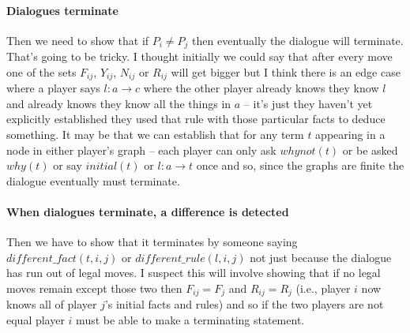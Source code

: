 \documentclass{blue-book}
\newcommand{\drule}[3]{\ensuremath{#1:#2 \rightarrow #3}}
\begin{document}
\paragraph{Dialogues terminate} Then we need to show that if $P_i \neq P_j$ then eventually the dialogue will terminate.  That's going to be tricky.  I thought initially we could say that after every move one of the sets $F_{ij}$, $Y_{ij}$, $N_{ij}$ or $R_{ij}$ will get bigger but I think there is an edge case where a player says $\drule{l}{a}{c}$ where the other player already knows they know $l$ and already knows they know all the things in $a$ -- it's just they haven't yet explicitly established they used that rule with those particular facts to deduce something.  It may be that we can establish that for any term $t$ appearing in a node in either player's graph -- each player can only ask $whynot(t)$ or be asked $why(t)$ or say $initial(t)$ or $\drule{l}{a}{t}$ once and so, since the graphs are finite the dialogue eventually must terminate.  


\paragraph{When dialogues terminate, a difference is detected} Then we have to show that it terminates by someone saying $\mathit{different\_fact}(t, i, j)$ or $\mathit{different\_rule}(l, i, j)$ not just because the dialogue has run out of legal moves.  I suspect this will involve showing that if no legal moves remain except those two then $F_{ij} = F_j$ and $R_{ij} = R_{j}$ (i.e., player $i$ now knows all of player $j$'s initial facts and rules) and so if the two players are not equal player $i$ must be able to make a terminating statement.
\end{document}
